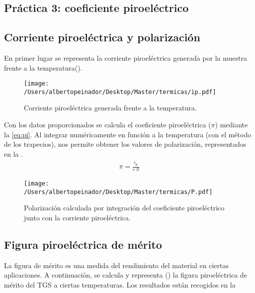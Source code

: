 \documentclass[a4paper, 12pt, spanish]{article}
\begin{document}
\begin{multicols}{2}
\section{Práctica 3: coeficiente piroeléctrico}
\subsection*{Corriente piroeléctrica y polarización}
En primer lugar se representa la corriente piroeléctrica generada por la muestra frente a la temperatura().
\begin{figure}[H]
    \centering
    \texttt{[image: /Users/albertopeinador/Desktop/Master/termicas/ip.pdf]}
    \caption{Corriente piroeléctrica generada frente a la temperatura.}\label{fig:ip}
\end{figure}
Con los datos proporcionados se calcula el coeficiente piroeléctrica ($\pi$) mediante la \cref{eq:pi}. Al integrar numéricamente en función a la temperatura (con el método de los trapecios), nos permite obtener los valores de polarización, representados en la .
\begin{eqnarray}
    \pi = \frac{i_p}{r\ S}\label{eq:pi}
\end{eqnarray}

\begin{figure}[H]
    \centering
    \texttt{[image: /Users/albertopeinador/Desktop/Master/termicas/P.pdf]}
    \caption{Polarización calculada por integración del coeficiente piroeléctrico junto con la corriente piroeléctrica.}\label{fig:pol}
\end{figure}
\subsection*{Figura piroeléctrica de mérito}
La figura de mérito es una medida del rendimiento del material en ciertas aplicaciones. A continuación, se calcula y representa () la figura piroeléctrica de mérito del TGS a ciertas temperaturas. Los resultados están recogidos en la 


\end{multicols}
\end{document}
